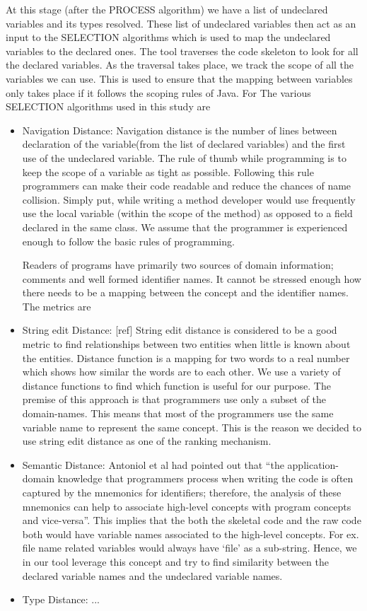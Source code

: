 At this stage (after the PROCESS algorithm) we have a list of undeclared variables and its types resolved. 
These list of undeclared variables then act as an input to the SELECTION algorithms which is used to map the undeclared variables to the declared ones. 
The tool traverses the code skeleton to look for all the declared variables. 
As the traversal takes place, we track the scope of all the variables we can use. 
This is used to ensure that the mapping between variables only takes place if it follows the scoping rules of Java. 
For  The various SELECTION algorithms used in this study are
\begin{itemize}
\item Navigation Distance:
Navigation distance is the number of lines between declaration of the variable(from the list of declared variables) and the first use of the undeclared variable. The rule of thumb while programming is to keep the scope of a variable as tight as possible. Following this rule programmers can make their code readable and reduce the chances of name collision. Simply put, while writing a method developer would use frequently use the local variable (within the scope of the method) as opposed to a field declared in the same class. We assume that the programmer is experienced enough to follow the basic rules of programming.
\par
Readers of programs have primarily two sources of domain information; comments and well formed identifier names. It cannot be stressed enough how there needs to be a mapping between the concept and the identifier names. The metrics are 
\item String edit Distance: [ref] String edit distance is considered to be a good metric to find relationships between two entities when little is known about the entities.
Distance function is a mapping for two words to a real number which shows how similar the words are to each other. 
We use a variety of distance functions to find which function is useful for our purpose. 
The premise of this approach is that programmers use only a subset of the domain-names. 
This means that most of the programmers use the same variable name to represent the same concept. 
This is the reason we decided to use string edit distance as one of the ranking mechanism.
\item Semantic Distance: Antoniol et al had pointed out that ``the application-domain knowledge that programmers process when writing the code is often captured by the mnemonics for identifiers;
therefore, the analysis of these mnemonics can help to associate high-level concepts with program concepts and vice-versa''. 
This implies that the both the skeletal code and the raw code both would have variable names associated to the high-level concepts. 
For ex. file name related variables would always have `file' as a sub-string. Hence, we in our tool leverage this concept and try to find similarity between the declared variable names and the undeclared variable names. 

\item Type Distance: ...
\end{itemize}


